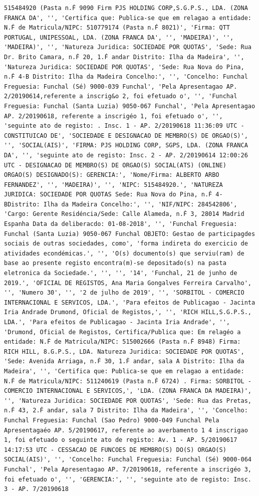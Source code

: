 \documentclass[
  12pt,
]{article}
\begin{document}
\begin{verbatim}
515484920 (Pasta n.Ḟ 9090 Firm PJS HOLDING CORP,S.G.P.S., LDA. (ZONA FRANCA DA', '', 'Certifica que: Publica-se que em relagao a entidade: N.Ḟ de Matricula/NIPC: 510779174 (Pasta n.Ḟ 8021)', 'Firma: QTT PORTUGAL, UNIPESSOAL, LDA. (ZONA FRANCA DA', '', 'MADEIRA)', '', 'MADEIRA)', '', 'Natureza Juridica: SOCIEDADE POR QUOTAS', 'Sede: Rua Dr. Brito Camara, n.Ḟ 20, 1.Ḟ andar Distrito: Ilha da Madeira', '', 'Natureza Juridica: SOCIEDADE POR QUOTAS', 'Sede: Rua Nova do Pina, n.Ḟ 4-B Distrito: Ilha da Madeira Concelho:', '', 'Concelho: Funchal Freguesia: Funchal (Sé) 9000-039 Funchal', 'Pela Apresentagao AP. 2/20190614,referente a inscrig&o 2, foi efetuado o', '', 'Funchal Freguesia: Funchal (Santa Luzia) 9050-067 Funchal', 'Pela Apresentagao AP. 2/20190618, referente a inscrigéo 1, foi efetuado o', '', 'seguinte ato de registo: . Insc. 1 - AP. 2/20190618 11:36:09 UTC - CONSTITUICAO DE', 'SOCIEDADE E DESIGNACAO DE MEMBRO(S) DE ORGAO(S)', '', 'SOCIAL(AIS)', 'FIRMA: PJS HOLDING CORP, SGPS, LDA. (ZONA FRANCA DA', '', 'seguinte ato de registo: Insc. 2 - AP. 2/20190614 12:00:26 UTC - DESIGNACAO DE MEMBRO(S) DE ORGAO(S) SOCIAL(ATS) (ONLINE) ORGAO(S) DESIGNADO(S): GERENCIA:', 'Nome/Firma: ALBERTO ARBO FERNANDEZ', '', 'MADEIRA)', '', 'NIPC: 515484920.', 'NATUREZA JURIDICA: SOCIEDADE POR QUOTAS Sede: Rua Nova do Pina, n.Ḟ 4-BDistrito: Ilha da Madeira Concelho:', '', 'NIF/NIPC: 284542806', 'Cargo: Gerente Residéncia/Sede: Calle Alameda, n.Ḟ 3, 28014 Madrid Espanha Data da deliberacdo: 01-08-2018', '', 'Funchal Freguesia: Funchal (Santa Luzia) 9050-067 Funchal OBJETO: Gestao de participagdes sociais de outras sociedades, como', 'forma indireta do exercicio de atividades econdémicas.', '', 'O(s) documento(s) que serviu(ram) de base ao presente registo encontra(m)-se depositado(s) na pasta eletronica da Sociedade.', '', '', '14', 'Funchal, 21 de junho de 2019.', 'OFICIAL DE REGISTOS, Ana Maria Gongalves Ferreira Carvalho', '', 'Numero 30', '', '2 de julho de 2019', '', 'SORBITOL - COMERCIO INTERNACIONAL E SERVICOS, LDA.', 'Para efeitos de Publicagao - Jacinta Iria Andrade Drumond, Oficial de Registos,', '', 'RICH HILL,S.G.P.S., LDA.', 'Para efeitos de Publicagao - Jacinta Iria Andrade', '', 'Drumond, Oficial de Registos, Certifica/Publica que: Em relagéo a entidade: N.Ḟ de Matricula/NIPC: 515002666 (Pasta n.Ḟ 8948) Firma: RICH HILL, 8.G.P.S., LDA. Natureza Juridica: SOCIEDADE POR QUOTAS', 'Sede: Avenida Arriaga, n.Ḟ 30, 1.Ḟ andar, sala A Distrito: Ilha da Madeira', '', 'Certifica que: Publica-se que em relagao a entidade: N.Ḟ de Matricula/NIPC: 511240619 (Pasta n.Ḟ 6724) . Firma: SORBITOL - COMERCIO INTERNACIONAL E SERVICOS,', 'LDA. (ZONA FRANCA DA MADEIRA)', '', 'Natureza Juridica: SOCIEDADE POR QUOTAS', 'Sede: Rua das Pretas, n.Ḟ 43, 2.Ḟ andar, sala 7 Distrito: Ilha da Madeira', '', 'Concelho: Funchal Freguesia: Funchal (Sao Pedro) 9000-049 Funchal Pela Apresentagaéo AP. 5/20190617, referente ao averbamento 1 4 inscrigao 1, foi efetuado o seguinte ato de registo: Av. 1 - AP. 5/20190617 14:17:53 UTC - CESSACAO DE FUNCOES DE MEMBRO(S) DO(S) ORGAO(S) SOCIAL(AIS)', '', 'Concelho: Funchal Freguesia: Funchal (Sé) 9000-064 Funchal', 'Pela Apresentagao AP. 7/20190618, referente a inscrigéo 3, foi efetuado o', '', 'GERENCIA:', '', 'seguinte ato de registo: Insc. 3 - AP. 7/20190618 
\end{verbatim}
\end{document}
